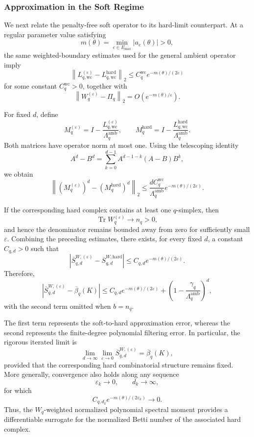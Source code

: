 \documentclass[pdflatex,sn-mathphys-num]{sn-jnl}%
\theoremstyle{thmstyleone}%
\theoremstyle{thmstyletwo}%
\theoremstyle{thmstylethree}%
\begin{document}
\subsubsection{Approximation in the Soft Regime}

We next relate the penalty-free soft operator to its hard-limit counterpart.
At a regular parameter value satisfying
\[
m(\theta)
=
\min_{e\in E_{\max}}
|a_e(\theta)|
>
0,
\]
the same weighted-boundary estimates used for the general ambient operator imply
\[
\left\|
L_{q,\mathrm{wc}}^{(\varepsilon)}
-
L_{q,\mathrm{wc}}^{\mathrm{hard}}
\right\|_2
\le
C_q^{\mathrm{wc}}
e^{-m(\theta)/(2\varepsilon)}
\]
for some constant \(C_q^{\mathrm{wc}}>0\), together with
\[
\left\|
W_q^{(\varepsilon)}
-
\Pi_q
\right\|_2
=
O\left(
e^{-m(\theta)/\varepsilon}
\right).
\]

For fixed \(d\), define
\[
M_q^{(\varepsilon)}
=
I-
\frac{
L_{q,\mathrm{wc}}^{(\varepsilon)}
}{
\Lambda_q^{\mathrm{amb}}
},
\qquad
M_q^{\mathrm{hard}}
=
I-
\frac{
L_{q,\mathrm{wc}}^{\mathrm{hard}}
}{
\Lambda_q^{\mathrm{amb}}
}.
\]
Both matrices have operator norm at most one.
Using the telescoping identity
\[
A^d-B^d
=
\sum_{k=0}^{d-1}
A^{d-1-k}(A-B)B^k,
\]
we obtain
\[
\left\|
\left(M_q^{(\varepsilon)}\right)^d
-
\left(M_q^{\mathrm{hard}}\right)^d
\right\|_2
\le
\frac{
d C_q^{\mathrm{wc}}
}{
\Lambda_q^{\mathrm{amb}}
}
e^{-m(\theta)/(2\varepsilon)}.
\]

If the corresponding hard complex contains at least one \(q\)-simplex, then
\[
\operatorname{Tr}
W_q^{(\varepsilon)}
\longrightarrow
n_q>0,
\]
and hence the denominator remains bounded away from zero for sufficiently small \(\varepsilon\).
Combining the preceding estimates, there exists, for every fixed \(d\), a constant
\(C_{q,d}>0\) such that
\[
\left|
\overline S_{q,d}^{W,(\varepsilon)}
-
\overline S_{q,d}^{W,\mathrm{hard}}
\right|
\le
C_{q,d}
e^{-m(\theta)/(2\varepsilon)}.
\]
Therefore,
\[
\left|
\overline S_{q,d}^{W,(\varepsilon)}
-
\overline\beta_q(K)
\right|
\le
C_{q,d}
e^{-m(\theta)/(2\varepsilon)}
+
\left(
1-
\frac{
\gamma_q
}{
\Lambda_q^{\mathrm{amb}}
}
\right)^d,
\]
with the second term omitted when \(b=n_q\).

The first term represents the soft-to-hard approximation error, whereas the second represents the finite-degree polynomial filtering error.
In particular, the rigorous iterated limit is
\[
\lim_{d\to\infty}
\lim_{\varepsilon\to0}
\overline S_{q,d}^{W,(\varepsilon)}
=
\overline\beta_q(K),
\]
provided that the corresponding hard combinatorial structure remains fixed.
More generally, convergence also holds along any sequence
\[
\varepsilon_k\to0,
\qquad
d_k\to\infty,
\]
for which
\[
C_{q,d_k}
e^{-m(\theta)/(2\varepsilon_k)}
\longrightarrow
0.
\]
Thus, the \(W_q\)-weighted normalized polynomial spectral moment provides a differentiable surrogate for the normalized Betti number of the associated hard complex.
\end{document}
